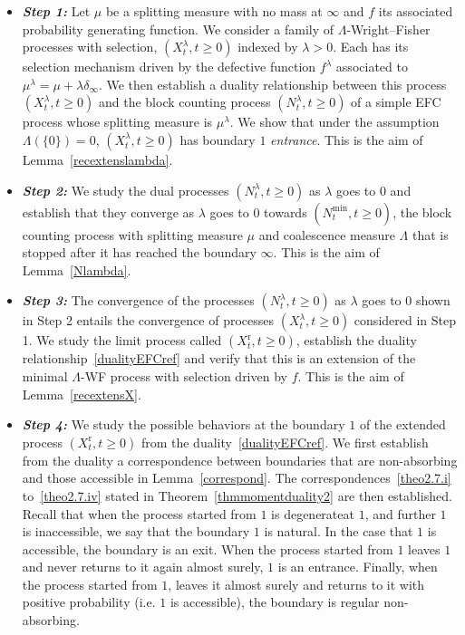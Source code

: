 \documentclass[10pt]{amsart}
\theoremstyle{definition}\newtheorem{defi}[theo]{Definition}\newtheorem{rema}[theo]{Remark}\newtheorem{exam}[theo]{Example}\newtheorem{exem}[theo]{Example}\newtheorem{nota}[theo]{Notation}
\newcommand{\rmr}{\mathrm{r}}
\begin{document}
\begin{itemize}
\item[-] \textbf{\emph{Step 1:}} Let $\mu$ be a splitting measure with no mass at $\infty$ and $f$ its associated probability generating function. We consider a family of $\Lambda$-Wright--Fisher processes with selection, $(X^{\lambda}_t,t\geq 0)$ indexed by $\lambda>0$. Each has its selection mechanism driven by the defective function $f^{\lambda}$ associated to $\mu^{\lambda}=\mu+\lambda\delta_{\infty}$. We then establish a duality relationship between this process $(X^{\lambda}_t,t\geq 0)$ and the block counting process $(N_t^{\lambda},t\geq 0)$ of a simple EFC process whose splitting measure is $\mu^{\lambda}$. We show that under the assumption $\Lambda(\{0\})=0$, $(X^{\lambda}_t,t\geq 0)$ has boundary $1$ \emph{entrance}. This is the aim of Lemma~\ref{recextenslambda}.
\item[-] \textbf{\emph{Step 2:}} We study the dual processes $(N_t^{\lambda},t\geq 0)$ as $\lambda$ goes to $0$ and establish that they converge as $\lambda$ goes to $0$ towards $(N_t^{\min},t\geq 0)$, the block counting process with splitting measure $\mu$ and coalescence measure $\Lambda$ that is stopped after it has reached the boundary $\infty$. This is the aim of Lemma~\ref{Nlambda}.
\item[-] \textbf{\emph{Step 3:}} The convergence of the processes $(N_t^{\lambda},t\geq 0)$ as $\lambda$ goes to $0$ shown in Step 2 entails the convergence of processes $(X^{\lambda}_t,t\geq 0)$ considered in Step 1. We study the limit process called $(X^{\rmr}_t,t\geq 0)$, establish the duality relationship~\eqref{dualityEFCref} and verify that this is an extension of the minimal $\Lambda$-WF process with selection driven by $f$. This is the aim of Lemma~\ref{recextensX}.
\item[-] \textbf{\emph{Step 4:}} We study the possible behaviors at the boundary $1$ of the extended process $(X_t^{\rmr},t\geq 0)$ from the duality~\eqref{dualityEFCref}. We first establish from the duality a correspondence between boundaries that are non-absorbing and those accessible in Lemma~\ref{correspond}. The correspondences~\eqref{theo2.7.i} to~\eqref{theo2.7.iv} stated in Theorem~\ref{thmmomentduality2} are then established. Recall that when the process started from $1$ is degenerate\linebreak at $1$, and further $1$ is inaccessible, we say that the boundary $1$ is natural. In the case that $1$ is accessible, the boundary is an exit. When the process started from $1$ leaves $1$ and never returns to it again almost surely, $1$ is an entrance. Finally, when the process started from $1$, leaves it almost surely and returns to it with positive probability (i.e. $1$ is accessible), the boundary is regular non-absorbing.
\end{itemize}
\end{document}
